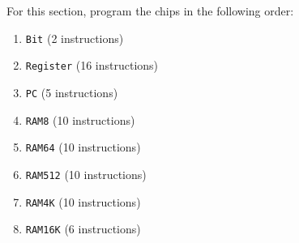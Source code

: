 \documentclass[11pt]{article}
\begin{document}
For this section, program the chips in the following order:

\begin{enumerate}
\item \texttt{Bit} (2 instructions)
\item \texttt{Register} (16 instructions) 
\item \texttt{PC} (5 instructions) 
\item \texttt{RAM8} (10 instructions)
\item \texttt{RAM64} (10 instructions) 
\item \texttt{RAM512} (10 instructions) 
\item \texttt{RAM4K} (10 instructions)  
\item \texttt{RAM16K} (6 instructions) 
\end{enumerate}
\end{document}
